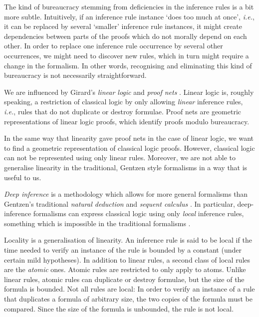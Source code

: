 The kind of bureaucracy stemming from deficiencies in the inference rules is a bit more subtle. Intuitively, if an inference rule instance `does too much at once', \emph{i.e.}, it can be replaced by several `smaller' inference rule instances, it might create dependencies between parts of the proofs which do not morally depend on each other. In order to replace one inference rule occurrence by several other occurrences, we might need to discover new rules, which in turn might require a change in the formalism. In other words, recognising and eliminating this kind of bureaucracy is not necessarily straightforward.


We are influenced by Girard's \emph{linear logic} and \emph{proof nets} \cite{Gira:87:Linear-L:wm}. Linear logic is, roughly speaking, a restriction of classical logic by only allowing \emph{linear} inference rules, \emph{i.e.}, rules that do not duplicate or destroy formulae. Proof nets are geometric representations of linear logic proofs, which identify proofs modulo bureaucracy.

In the same way that linearity gave proof nets in the case of linear logic, we want to find a geometric representation of classical logic proofs. However, classical logic can not be represented using only linear rules. Moreover, we are not able to generalise linearity in the traditional, Gentzen style formalisms in a way that is useful to us.

\emph{Deep inference} \cite{Gugl:06:A-System:kl} is a methodology which allows for more general formalisms than Gentzen's traditional \emph{natural deduction} and \emph{sequent calculus} \cite{Gent:69:Investig:xi}. In particular, deep-inference formalisms can express classical logic using only \emph{local} \cite{BrunTiu:01:A-Local-:mz} inference rules, something which is impossible in the traditional formalisms \cite{Brun:03:Two-Rest:mn}.

Locality is a generalisation of linearity. An inference rule is said to be local if the time needed to verify an instance of the rule is bounded by a constant (under certain mild hypotheses). In addition to linear rules, a second class of local rules are the \emph{atomic} ones. Atomic rules are restricted to only apply to atoms. Unlike linear rules, atomic rules can duplicate or destroy formulae, but the size of the formula is bounded. Not all rules are local: In order to verify an instance of a rule that duplicates a formula of arbitrary size, the two copies of the formula must be compared. Since the size of the formula is unbounded, the rule is not local.

